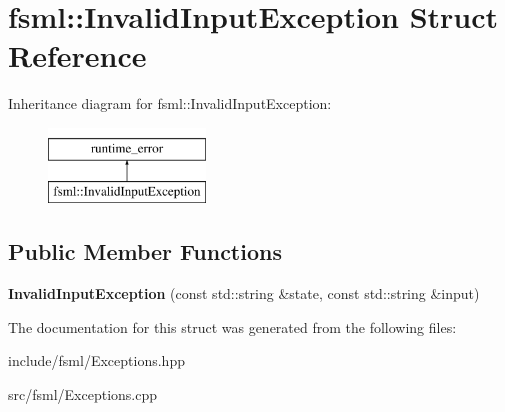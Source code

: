 \hypertarget{structfsml_1_1InvalidInputException}{\section{fsml\-:\-:Invalid\-Input\-Exception Struct Reference}
\label{structfsml_1_1InvalidInputException}
}
Inheritance diagram for fsml\-:\-:Invalid\-Input\-Exception\-:\begin{figure}[H]
\begin{center}
\leavevmode
\includegraphics[height=2.000000cm]{structfsml_1_1InvalidInputException}
\end{center}
\end{figure}
\subsection*{Public Member Functions}
\begin{DoxyCompactItemize}
\item 
\hypertarget{structfsml_1_1InvalidInputException_aa7373c1db918bf47817d2d85e089ee50}{{\bfseries Invalid\-Input\-Exception} (const std\-::string \&state, const std\-::string \&input)}\label{structfsml_1_1InvalidInputException_aa7373c1db918bf47817d2d85e089ee50}

\end{DoxyCompactItemize}


The documentation for this struct was generated from the following files\-:\begin{DoxyCompactItemize}
\item 
include/fsml/Exceptions.\-hpp\item 
src/fsml/Exceptions.\-cpp\end{DoxyCompactItemize}
